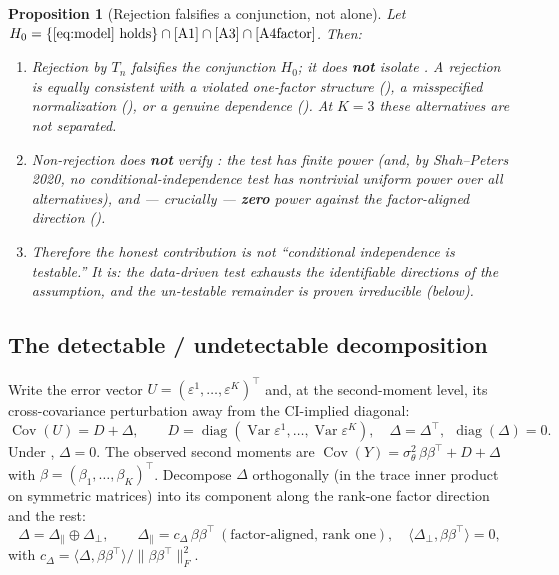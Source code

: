\documentclass[11pt]{article}
\newtheorem{proposition}{Proposition}
\theoremstyle{definition}
\newcommand{\Var}{\operatorname{Var}}
\newcommand{\Cov}{\operatorname{Cov}}
\newcommand{\Th}{\theta}
\newcommand{\lat}{\Th}
\newcommand{\Dperp}{\Delta_{\perp}}
\newcommand{\Dpar}{\Delta_{\parallel}}
\DeclareMathOperator{\diag}{diag}
\begin{document}
\begin{proposition}[Rejection falsifies a conjunction, not  alone]
\label{prop:meaning}
Let $H_0=\{\text{\eqref{eq:model} holds}\}\cap\Cref{A1}\cap\Cref{A3}\cap
\Cref{A4factor}$. Then:
\begin{enumerate}[label=(\alph*),leftmargin=2.2em]
\item Rejection by $T_n$ falsifies the \emph{conjunction} $H_0$; it does
\textbf{not} isolate . A rejection is equally consistent with a
violated one-factor structure (), a misspecified normalization
(), or a genuine dependence (). At $K=3$ these alternatives
are \emph{not} separated.
\item Non-rejection does \textbf{not} verify : the test has finite
power (and, by Shah--Peters 2020, no conditional-independence test has
nontrivial uniform power over all alternatives), and --- crucially ---
\textbf{zero} power against the factor-aligned direction ().
\item Therefore the honest contribution is not ``conditional independence is
testable.'' It is: the data-driven test \emph{exhausts the identifiable
directions} of the assumption, and the un-testable remainder is proven
irreducible (below).
\end{enumerate}
\end{proposition}

\subsection{The detectable / undetectable decomposition}

Write the error vector $U=(\varepsilon^1,\dots,\varepsilon^K)^\top$ and, at the
second-moment level, its cross-covariance perturbation away from the
CI-implied diagonal:
\[
  \Cov(U)=D+\Delta,\qquad D=\diag(\Var\varepsilon^1,\dots,\Var\varepsilon^K),
  \quad \Delta=\Delta^\top,\ \ \diag(\Delta)=0 .
\]
Under , $\Delta=0$. The observed second moments are
$\Cov(Y)=\sigma_\lat^2\,\beta\beta^\top+D+\Delta$ with $\beta=(\beta_1,\dots,
\beta_K)^\top$. Decompose $\Delta$ orthogonally (in the trace inner product on
symmetric matrices) into its component along the rank-one factor direction and
the rest:
\begin{equation}\label{eq:decomp}
  \Delta=\Dpar\oplus\Dperp,
  \qquad
  \Dpar=c_\Delta\,\beta\beta^\top\ (\text{factor-aligned, rank one}),
  \quad
  \langle\Dperp,\beta\beta^\top\rangle=0 ,
\end{equation}
with $c_\Delta=\langle\Delta,\beta\beta^\top\rangle/\|\beta\beta^\top\|_F^2$.
\end{document}
